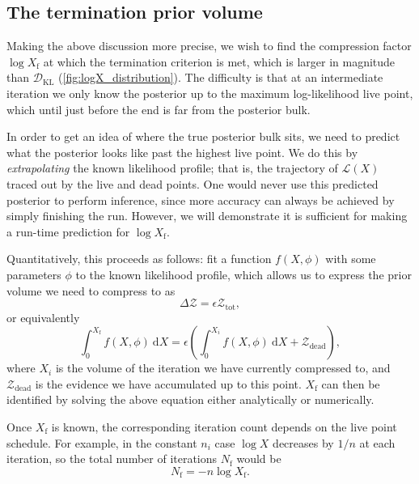 \documentclass[usenatbib]{mnras}
\newcommand{\nlive}{n_i}
\newcommand{\Like}{\mathcal{L}}
\newcommand{\DKL}{\mathcal{D}_\mathrm{KL}}
\begin{document}
\subsection{The termination prior volume}
Making the above discussion more precise, we wish to find the compression factor $\log X_ \mathrm{f}$ at which the termination criterion is met, which is larger in magnitude than $\DKL$ (\cref{fig:logX_distribution}). The difficulty is that at an intermediate iteration we only know the posterior up to the maximum log-likelihood live point, which until just before the end is far from the posterior bulk. 
\par
In order to get an idea of where the true posterior bulk sits, we need to predict what the posterior looks like past the highest live point. We do this by \textit{extrapolating} the known likelihood profile; that is, the trajectory of $\Like(X)$ traced out by the live and dead points. 
One would never use this predicted posterior to perform inference, since more accuracy can always be achieved by simply finishing the run. However, we will demonstrate it is sufficient for making a run-time prediction for $\log X_\mathrm{f}$. 
\par
Quantitatively, this proceeds as follows: fit a function $f(X, \phi)$  with some parameters $\phi$ to the known likelihood profile, which allows us to express the prior volume we need to compress to as
\begin{equation}
	\Delta \mathcal{Z} = \epsilon \mathcal{Z}_\mathrm{tot},
\end{equation}
or equivalently
\begin{equation}\label{endpoint}
	\int_0^{X_\mathrm{f}} f(X, \phi)\ \mathrm{d}X = \epsilon \left( \int_0^{X_i} f(X, \phi)\ \mathrm{d}X + \mathcal{Z}_\mathrm{dead} \right),
\end{equation}
where $X_i$ is the volume of the iteration we have currently compressed to, and $\mathcal{Z}_\mathrm{dead}$ is the evidence we have accumulated up to this point. $X_\mathrm{f}$ can then be identified by solving the above equation either analytically or numerically. 
\par
Once $X_\mathrm{f}$ is known, the corresponding iteration count depends on the live point schedule. For example, in the constant $\nlive$ case $\log X$ decreases by $1/n$ at each iteration, so the total number of iterations $N_\mathrm{f}$ would be
\begin{equation}
	N_\mathrm{f} = - n\log X_\mathrm{f} .
\end{equation}
\end{document}
